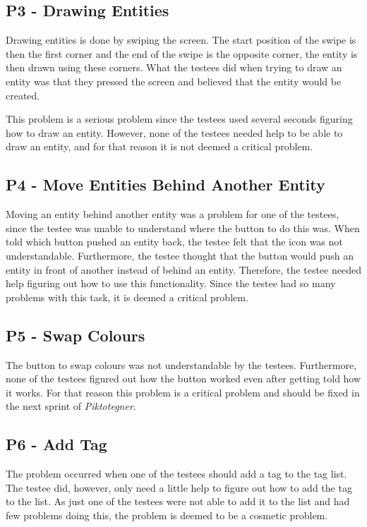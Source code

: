 \subsection*{P3 - Drawing Entities}
Drawing entities is done by swiping the screen.
The start position of the swipe is then the first corner and the end of the swipe is the opposite corner, the entity is then drawn using these corners.
What the testees did when trying to draw an entity was that they pressed the screen and believed that the entity would be created.

This problem is a serious problem since the testees used several seconds figuring how to draw an entity.
However, none of the testees needed help to be able to draw an entity, and for that reason it is not deemed a critical problem.

\subsection*{P4 - Move Entities Behind Another Entity}
Moving an entity behind another entity was a problem for one of the testees, since the testee was unable to understand where the button to do this was.
When told which button pushed an entity back, the testee felt that the icon was not understandable.
Furthermore, the testee thought that the button would push an entity in front of another instead of behind an entity.
Therefore, the testee needed help figuring out how to use this functionality.
Since the testee had so many problems with this task, it is deemed a critical problem.

\subsection*{P5 - Swap Colours}
The button to swap colours was not understandable by the testees.
Furthermore, none of the testees figured out how the button worked even after getting told how it works.
For that reason this problem is a critical problem and should be fixed in the next sprint of \textit{Piktotegner}.

\subsection*{P6 - Add Tag}
The problem occurred when one of the testees should add a tag to the tag list.
The testee did, however, only need a little help to figure out how to add the tag to the list.
As just one of the testees were not able to add it to the list and had few problems doing this, the problem is deemed to be a cosmetic problem.

